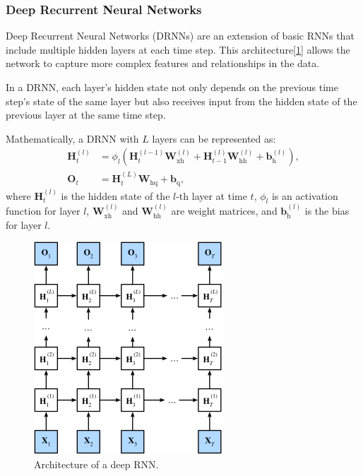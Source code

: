 \documentclass[10pt,twocolumn,letterpaper]{article}
\begin{document}
\subsubsection{Deep Recurrent Neural Networks}
\label{sec:drnn}
Deep Recurrent Neural Networks (DRNNs) are an extension of basic RNNs that include multiple hidden layers at each time step\cite{pascanu2019construct}. This architecture[\ref{fig:drnn}] allows the network to capture more complex features and relationships in the data.

In a DRNN, each layer's hidden state not only depends on the previous time step's state of the same layer but also receives input from the hidden state of the previous layer at the same time step.

Mathematically, a DRNN with \( L \) layers can be represented as:
\begin{align*}
	\mathbf{H}_t^{(l)} &= \phi_l(\mathbf{H}_t^{(l-1)} \mathbf{W}_{\textrm{xh}}^{(l)} + \mathbf{H}_{t-1}^{(l)} \mathbf{W}_{\textrm{hh}}^{(l)}  + \mathbf{b}_\textrm{h}^{(l)}),\\
	\mathbf{O}_t &= \mathbf{H}_t^{(L)} \mathbf{W}_{\textrm{hq}} + \mathbf{b}_\textrm{q},
\end{align*}
where \( \mathbf{H}_t^{(l)} \) is the hidden state of the \( l \)-th layer at time \( t \), \( \phi_l \) is an activation function for layer \( l \), \( \mathbf{W}_{\textrm{xh}}^{(l)} \) and \( \mathbf{W}_{\textrm{hh}}^{(l)} \) are weight matrices, and \( \mathbf{b}_\textrm{h}^{(l)} \) is the bias for layer \( l \).
\begin{figure}[h]
	\centering
	\includegraphics[width=0.7\columnwidth]{deep-rnn}
	\caption{Architecture of a deep RNN\cite{zhang2023dive}.}
	\label{fig:drnn}
\end{figure}
\end{document}
